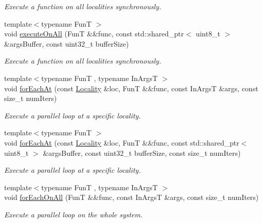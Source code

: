 \begin{DoxyCompactItemize}
\begin{DoxyCompactList}\small\item\em Execute a function on all localities synchronously. \end{DoxyCompactList}\item 
{\footnotesize template$<$typename Fun\-T $>$ }\\void \hyperlink{namespaceshad_1_1rt_af82c01717fef30752cd60051a92a9bee}{execute\-On\-All} (Fun\-T \&\&func, const std\-::shared\-\_\-ptr$<$ uint8\-\_\-t $>$ \&args\-Buffer, const uint32\-\_\-t buffer\-Size)
\begin{DoxyCompactList}\small\item\em Execute a function on all localities synchronously. \end{DoxyCompactList}\item 
{\footnotesize template$<$typename Fun\-T , typename In\-Args\-T $>$ }\\void \hyperlink{namespaceshad_1_1rt_a3701740e6d6681499063a0b5fa43645b}{for\-Each\-At} (const \hyperlink{classshad_1_1rt_1_1Locality}{Locality} \&loc, Fun\-T \&\&func, const In\-Args\-T \&args, const size\-\_\-t num\-Iters)
\begin{DoxyCompactList}\small\item\em Execute a parallel loop at a specific locality. \end{DoxyCompactList}\item 
{\footnotesize template$<$typename Fun\-T $>$ }\\void \hyperlink{namespaceshad_1_1rt_a7d0647bae3b6f6a7c870fee9b69bbf8e}{for\-Each\-At} (const \hyperlink{classshad_1_1rt_1_1Locality}{Locality} \&loc, Fun\-T \&\&func, const std\-::shared\-\_\-ptr$<$ uint8\-\_\-t $>$ \&args\-Buffer, const uint32\-\_\-t buffer\-Size, const size\-\_\-t num\-Iters)
\begin{DoxyCompactList}\small\item\em Execute a parallel loop at a specific locality. \end{DoxyCompactList}\item 
{\footnotesize template$<$typename Fun\-T , typename In\-Args\-T $>$ }\\void \hyperlink{namespaceshad_1_1rt_a681ee8fbfec5d92c2bc8cd3851eae0c7}{for\-Each\-On\-All} (Fun\-T \&\&func, const In\-Args\-T \&args, const size\-\_\-t num\-Iters)
\begin{DoxyCompactList}\small\item\em Execute a parallel loop on the whole system. \end{DoxyCompactList}\item 

\end{DoxyCompactItemize}
